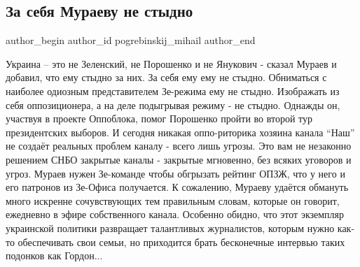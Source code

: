  
 
 
 
 
 
\subsection{За себя Мураеву не стыдно}
\label{sec:04_01_2022.fb.pogrebinskij_mihail.1.muraev}
 
\ifcmt
 author_begin
   author_id pogrebinskij_mihail
 author_end
\fi

Украина – это не Зеленский, не Порошенко и не Янукович - сказал Мураев и
добавил, что ему стыдно за них. За себя ему ему не стыдно. Обниматься с
наиболее одиозным представителем Зе-режима ему не стыдно. Изображать из себя
оппозиционера, а на деле подыгрывая режиму - не стыдно. Однажды он, участвуя в
проекте Оппоблока, помог Порошенко пройти во второй тур президентских выборов.
И сегодня никакая оппо-риторика хозяина канала \enquote{Наш} не создаёт реальных
проблем каналу - всего лишь угрозы. Это вам не незаконно решением СНБО закрытые
каналы - закрытые мгновенно, без всяких уговоров и угроз. Мураев нужен
Зе-команде чтобы обгрызать рейтинг ОПЗЖ, что у него и его патронов из Зе-Офиса
получается. К сожалению, Мураеву удаётся обмануть много искренне сочувствующих
тем правильным словам, которые он говорит, ежедневно в эфире собственного
канала. Особенно обидно, что этот экземпляр украинской политики развращает
талантливых журналистов, которым нужно как-то обеспечивать свои семьи, но
приходится  брать бесконечные интервью таких подонков как Гордон...

